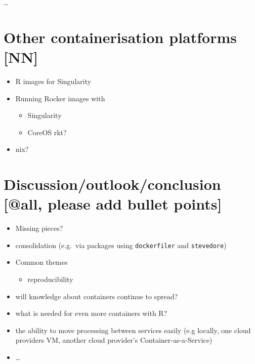 \ldots{}

\hypertarget{other-containerisation-platforms-nn}{%
\section{Other containerisation platforms
{[}NN{]}}\label{other-containerisation-platforms-nn}}

\begin{itemize}
\tightlist
\item
  R images for Singularity
\item
  Running Rocker images with

  \begin{itemize}
  \tightlist
  \item
    Singularity
  \item
    CoreOS rkt?
  \end{itemize}
\item
  nix?
\end{itemize}

\hypertarget{discussionoutlookconclusion-please-add-bullet-pointsall-please-add-bullet-points}{%
\section{\texorpdfstring{Discussion/outlook/conclusion {[}@all, please
add bullet
points{]}}{Discussion/outlook/conclusion , please add bullet points{[}@all, please add bullet points{]}}}\label{discussionoutlookconclusion-please-add-bullet-pointsall-please-add-bullet-points}}

\begin{itemize}
\tightlist
\item
  Missing pieces?
\item
  consolidation (e.g.~via packages using \texttt{dockerfiler} and
  \texttt{stevedore})
\item
  Common themes

  \begin{itemize}
  \tightlist
  \item
    reproducibility
  \end{itemize}
\item
  will knowledge about containers continue to spread?
\item
  what is needed for even more containers with R?
\item
  the ability to move processing between services easily (e.g locally,
  one cloud providers VM, another cloud provider's
  Container-as-a-Service)
\item
  \ldots{}
\end{itemize}

